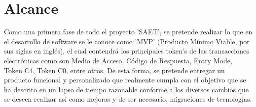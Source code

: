 \section{Alcance}
Como una primera fase de todo el proyecto 'SAET', se pretende realizar lo que en el desarrollo de software se le conoce como 'MVP' (Producto Mínimo Viable, por sus siglas en inglés), el cual contendrá los principales token's de las transacciones electrónicas como son Medio de Acceso, Código de Respuesta, Entry Mode, Token C4, Token C0, entre otros. De esta forma, se pretende entregar un producto funcional y personalizado que realmente cumpla con el objetivo que se ha descrito en un lapso de tiempo razonable conforme a los diversos cambios que se deseen realizar así como mejoras y de ser necesario, migraciones de tecnologías.